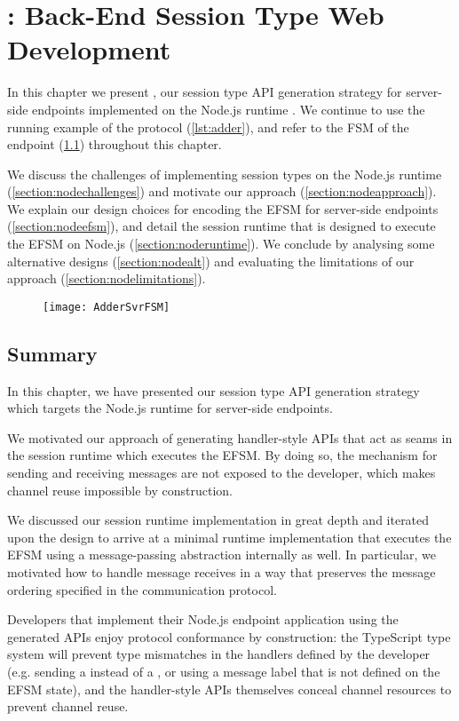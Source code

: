 \chapter{\nodecodegen: Back-End Session Type Web Development}
\label{chap:node}

In this chapter we present \nodecodegen,
our session type API generation strategy for 
server-side endpoints implemented on the Node.js runtime 
\cite{nodejs}.
We continue to use the running example of the 
protocol (\cref{lst:adder}),
and refer to the FSM of the  endpoint
(\cref{fig:addersvrfsm}) throughout this chapter.

We discuss the challenges of implementing
session types on the Node.js runtime 
(\cref{section:nodechallenges})
and motivate our approach (\cref{section:nodeapproach}).
We explain our design choices for encoding
the EFSM for server-side endpoints (\cref{section:nodeefsm}),
and detail the session runtime that is designed
to execute the EFSM on Node.js (\cref{section:noderuntime}).
We conclude by analysing some alternative designs 
(\cref{section:nodealt}) and evaluating the limitations 
of our approach (\cref{section:nodelimitations}).

\begin{figure}[!b]
\centering
\texttt{[image: AdderSvrFSM]}
\label{fig:addersvrfsm}
\end{figure}








\section{Summary}
In this chapter, we have presented
our session type API generation strategy
which targets the Node.js runtime for server-side
endpoints.

We motivated our approach of generating
handler-style APIs that act as seams in the session runtime
which executes the EFSM.
By doing so, the mechanism for sending and receiving
messages are not exposed to the developer,
which makes channel reuse impossible by construction.

We discussed our session runtime implementation in great
depth and iterated upon the design to arrive at 
a minimal runtime implementation that executes the EFSM
using a message-passing abstraction internally as well.
In particular, we motivated how to handle message receives
in a way that preserves the message ordering specified
in the communication protocol.

Developers that implement their Node.js endpoint application
using the generated APIs enjoy protocol conformance
by construction: 
the TypeScript type system will prevent type mismatches
in the handlers defined by the developer
(e.g. sending a  instead of 
a , or using a message label
that is not defined on the EFSM state),
and the handler-style APIs themselves conceal channel
resources to prevent channel reuse.